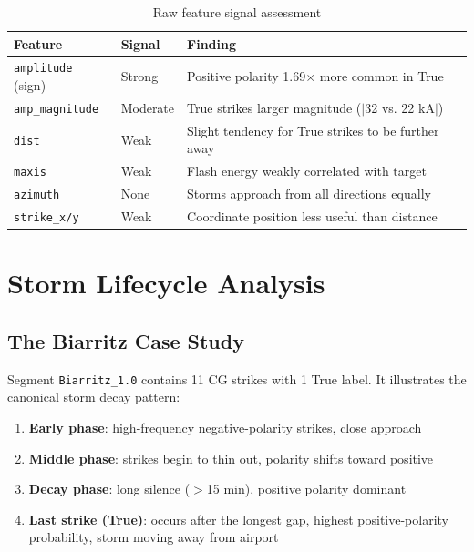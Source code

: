 \documentclass[12pt,a4paper]{article}
\begin{document}
\begin{table}[H]
\centering
\caption{Raw feature signal assessment}
\begin{tabular}{llp{7cm}}
\toprule
\textbf{Feature} & \textbf{Signal} & \textbf{Finding} \\
\midrule
\texttt{amplitude} (sign)   & Strong  & Positive polarity 1.69$\times$ more common in True \\
\texttt{amp\_magnitude}     & Moderate & True strikes larger magnitude ($|$32 vs. 22 kA$|$) \\
\texttt{dist}               & Weak    & Slight tendency for True strikes to be further away \\
\texttt{maxis}              & Weak    & Flash energy weakly correlated with target \\
\texttt{azimuth}            & None    & Storms approach from all directions equally \\
\texttt{strike\_x/y}        & Weak    & Coordinate position less useful than distance \\
\bottomrule
\end{tabular}
\end{table}

\section{Storm Lifecycle Analysis}

\subsection{The Biarritz Case Study}

Segment \texttt{Biarritz\_1.0} contains 11 CG strikes with 1 True label.
It illustrates the canonical storm decay pattern:

\begin{enumerate}[leftmargin=1.5em]
  \item \textbf{Early phase}: high-frequency negative-polarity strikes, close approach
  \item \textbf{Middle phase}: strikes begin to thin out, polarity shifts toward positive
  \item \textbf{Decay phase}: long silence ($>$15 min), positive polarity dominant
  \item \textbf{Last strike (True)}: occurs after the longest gap, highest positive-polarity
        probability, storm moving away from airport
\end{enumerate}
\end{document}
